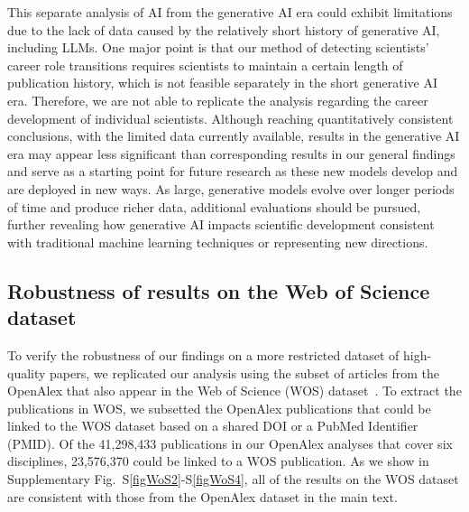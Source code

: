 This separate analysis of AI from the generative AI era could exhibit limitations due to the lack of data caused by the relatively short history of generative AI, including LLMs.
One major point is that our method of detecting scientists’ career role transitions requires scientists to maintain a certain length of publication history, which is not feasible separately in the short generative AI era.
Therefore, we are not able to replicate the analysis regarding the career development of individual scientists.
Although reaching quantitatively consistent conclusions, with the limited data currently available, results in the generative AI era may appear less significant than corresponding results in our general findings and serve as a starting point for future research as these new models develop and are deployed in new ways.
As large, generative models evolve over longer periods of time and produce richer data, additional evaluations should be pursued, further revealing how generative AI impacts scientific development consistent with traditional machine learning techniques or representing new directions.

\subsection{Robustness of results on the Web of Science dataset}
To verify the robustness of our findings on a more restricted dataset of high-quality papers, we replicated our analysis using the subset of articles from the OpenAlex that also appear in the Web of Science (WOS) dataset~\supercite{WoS,mongeon2016journal}.
To extract the publications in WOS, we subsetted the OpenAlex publications that could be linked to the WOS dataset based on a shared DOI or a PubMed Identifier (PMID).
Of the 41,298,433 publications in our OpenAlex analyses that cover six disciplines, 23,576,370 could be linked to a WOS publication.
As we show in Supplementary Fig.~S\ref{figWoS2}-S\ref{figWoS4}, all of the results on the WOS dataset are consistent with those from the OpenAlex dataset in the main text.

